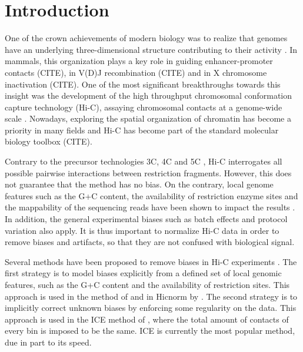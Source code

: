 \documentclass{bioinfo}
\begin{document}
\maketitle



\section{Introduction}

One of the crown achievements of modern biology was to realize that
genomes have an underlying three-dimensional structure contributing to
their activity \citep{rowley2016three}. In mammals, this organization
plays a key role in guiding enhancer-promoter contacts (CITE), in V(D)J
recombination (CITE) and in X chromosome inactivation (CITE). One of the
most significant breakthroughs towards this insight was the development of
the high throughput chromosomal conformation capture technology (Hi-C),
assaying chromosomal contacts at a genome-wide scale
\citep{lieberman2009comprehensive}. Nowadays, exploring the spatial
organization of chromatin has become a priority in many fields and
Hi-C has become part of the standard molecular biology toolbox (CITE).

Contrary to the precursor technologies 3C, 4C and 5C \citep{de2012decade},
Hi-C interrogates all possible pairwise interactions between restriction
fragments. However, this does not guarantee that the method has no bias.
On the contrary, local genome features such as the G+C content, the
availability of restriction enzyme sites and the mappability of the
sequencing reads have been shown to impact the results
\citep{yaffe2011probabilistic}. In addition, the general experimental
biases such as batch effects and protocol variation also apply. It is thus
important to normalize Hi-C data in order to remove biases and artifacts,
so that they are not confused with biological signal.

Several methods have been proposed to remove biases in Hi-C experiments
\citep{schmitt2016genome}. The first strategy is to model biases
explicitly from a defined set of local genomic features, such as the G+C
content and the availability of restriction sites. This approach is used
in the method of \cite{yaffe2011probabilistic} and in Hicnorm by
\cite{hu2012hicnorm}. The second strategy is to implicitly correct
unknown biases by enforcing some regularity on the data. This approach is
used in the ICE method of \cite{imakaev2012iterative}, where the total
amount of contacts of every bin is imposed to be the same. ICE is
currently the most popular method, due in part to its speed.
\end{document}
